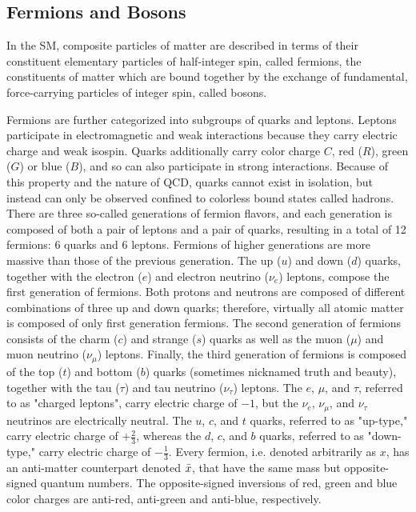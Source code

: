 \subsection{Fermions and Bosons}
In the SM, composite particles of matter are described in terms of their constituent elementary particles of half-integer spin, called fermions, the constituents of matter which are bound together by the exchange of fundamental, force-carrying particles of integer spin, called bosons. 

Fermions are further categorized into subgroups of quarks and leptons.
Leptons participate in electromagnetic and weak interactions because they carry electric charge and weak isospin.
Quarks additionally carry color charge $C$, red ($R$), green ($G$) or blue ($B$), and so can also participate in strong interactions.
Because of this property and the nature of QCD, quarks cannot exist in isolation, but instead can only be observed confined to colorless bound states called hadrons.
There are three so-called generations of fermion flavors, and each generation is composed of both a pair of leptons and a pair of quarks, resulting in a total of 12 fermions: 6 quarks and 6 leptons.
Fermions of higher generations are more massive than those of the previous generation.
The up ($u$) and down ($d$) quarks, together with the electron ($e$) and electron neutrino ($\nu_e$) leptons, compose the first generation of fermions.
Both protons and neutrons are composed of different combinations of three up and down quarks; therefore, virtually all atomic matter is composed of only first generation fermions.
The second generation of fermions consists of the charm ($c$) and strange ($s$) quarks as well as the muon ($\mu$) and muon neutrino ($\nu_\mu$) leptons.
Finally, the third generation of fermions is composed of the top ($t$) and bottom ($b$) quarks (sometimes nicknamed truth and beauty), together with the tau ($\tau$) and tau neutrino ($\nu_\tau$) leptons.
The $e$, $\mu$, and $\tau$, referred to as "charged leptons", carry electric charge of $-1$, but the $\nu_e$, $\nu_\mu$, and $\nu_\tau$ neutrinos are electrically neutral.
The $u$, $c$, and $t$ quarks, referred to as "up-type," carry electric charge of $+\frac{2}{3}$, whereas the $d$, $c$, and $b$ quarks, referred to as "down-type," carry electric charge of $-\frac{1}{3}$.
Every fermion, i.e. denoted arbitrarily as $x$, has an anti-matter counterpart denoted $\Bar{x}$, that have the same mass but opposite-signed quantum numbers.
The opposite-signed inversions of red, green and blue color charges are anti-red, anti-green and anti-blue, respectively.


